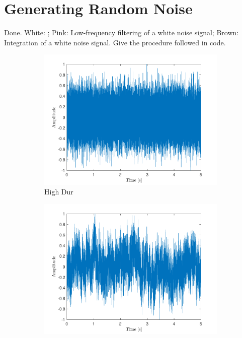 \documentclass[10pt]{article}
\begin{document}
\section{Generating Random Noise}
Done. White: ; Pink: Low-frequency filtering of a white noise signal; Brown: Integration of a white noise signal. Give the procedure followed in code.

\begin{figure}[ht]
    \centering
    \begin{subfigure}[b]{0.31\textwidth}
        \includegraphics[width=\textwidth]{problem11_white_noise_time.pdf}
        \caption{High Dur}
    \end{subfigure}
    \quad
    \begin{subfigure}[b]{0.31\textwidth}
        \includegraphics[width=\textwidth]{problem11_pink_noise_time.pdf}

\end{subfigure}
\end{figure}
\end{document}

